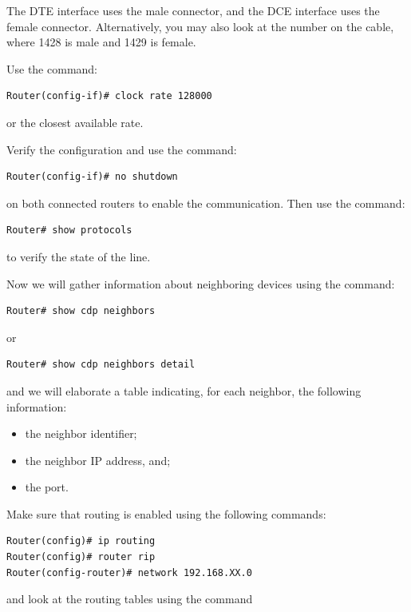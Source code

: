 The DTE interface uses the male connector, and the DCE interface uses the female connector. Alternatively, you may also look at the number on the cable, where 1428 is male and 1429 is female.

Use the command:

\begin{lstlisting}
Router(config-if)# clock rate 128000
\end{lstlisting}

or the closest available rate.

Verify the configuration and use the command:

\begin{lstlisting}
Router(config-if)# no shutdown
\end{lstlisting}

on both connected routers to enable the communication. Then use the command:

\begin{lstlisting}
Router# show protocols
\end{lstlisting}

to verify the state of the line.

Now we will gather information about neighboring devices using the command:

\begin{lstlisting}
Router# show cdp neighbors
\end{lstlisting}

or

\begin{lstlisting}
Router# show cdp neighbors detail
\end{lstlisting}

and we will elaborate a table indicating, for each neighbor, the following information:

\begin{itemize}
\item the neighbor identifier;
\item the neighbor IP address, and;
\item the port.
\end{itemize}

Make sure that routing is enabled using the following commands:

\begin{lstlisting}
Router(config)# ip routing
Router(config)# router rip
Router(config-router)# network 192.168.XX.0
\end{lstlisting}

and look at the routing tables using the command

